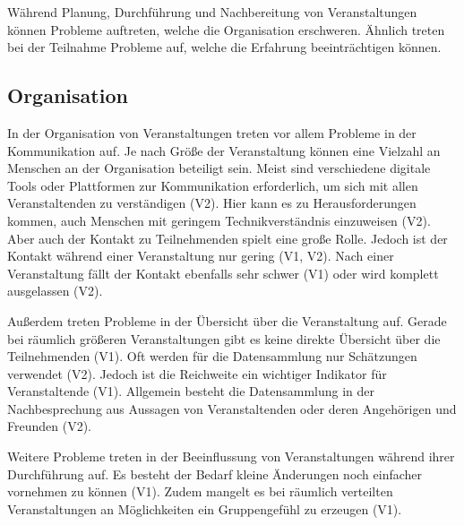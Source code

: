 Während Planung, Durchführung und Nachbereitung von Veranstaltungen können
Probleme auftreten, welche die Organisation erschweren. Ähnlich treten bei der
Teilnahme Probleme auf, welche die Erfahrung beeinträchtigen können.

\subsection{Organisation}

In der Organisation von Veranstaltungen treten vor allem Probleme in der
Kommunikation auf. Je nach Größe der Veranstaltung können eine Vielzahl an
Menschen an der Organisation beteiligt sein. Meist sind verschiedene digitale
Tools oder Plattformen zur Kommunikation erforderlich, um sich mit allen
Veranstaltenden zu verständigen (V2). Hier kann es zu Herausforderungen kommen,
auch Menschen mit geringem Technikverständnis einzuweisen (V2). Aber auch der
Kontakt zu Teilnehmenden spielt eine große Rolle. Jedoch ist der Kontakt während
einer Veranstaltung nur gering (V1, V2). Nach einer Veranstaltung fällt der
Kontakt ebenfalls sehr schwer (V1) oder wird komplett ausgelassen (V2).

Außerdem treten Probleme in der Übersicht über die Veranstaltung auf. Gerade bei
räumlich größeren Veranstaltungen gibt es keine direkte Übersicht über die
Teilnehmenden (V1). Oft werden für die Datensammlung nur Schätzungen verwendet
(V2). Jedoch ist die Reichweite ein wichtiger Indikator für Veranstaltende (V1).
Allgemein besteht die Datensammlung in der Nachbesprechung aus Aussagen von
Veranstaltenden oder deren Angehörigen und Freunden (V2).

Weitere Probleme treten in der Beeinflussung von Veranstaltungen während ihrer
Durchführung auf. Es besteht der Bedarf kleine Änderungen noch einfacher
vornehmen zu können (V1). Zudem mangelt es bei räumlich verteilten
Veranstaltungen an Möglichkeiten ein Gruppengefühl zu erzeugen (V1).





